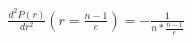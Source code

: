 \documentclass[preview]{standalone}
\begin{document}
\begin{align*}
\frac{d^{2}P(r)}{dr^{2}} {(r=\frac{n-1}{e})}=-\frac{1}{n*\frac{n-1}{e}}
\end{align*}
\end{document}

